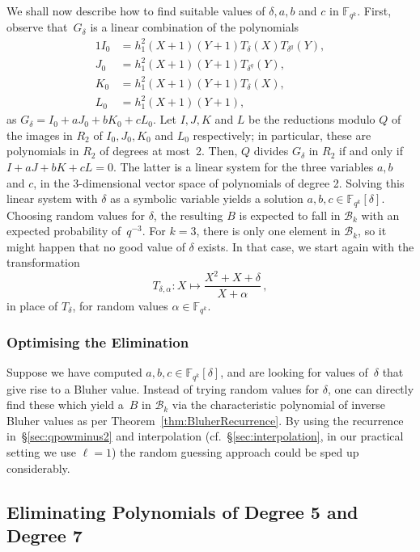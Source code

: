 \documentclass[11pt]{llncs}
\newcommand{\F}{\mathbb F}
\begin{document}
We shall now describe how to find suitable values of $\delta, a, b$ and $c$ in $\F_{q^k}$. First, observe that~$G_\delta$ is a linear combination of the polynomials
\begin{alignat*}{1}
I_0 &= h_1^2(X+1)(Y+1) T_\delta(X) T_{\delta^q}(Y),\\
J_0 &= h_1^2(X+1)(Y+1) T_{\delta^q}(Y),\\
K_0 &= h_1^2(X+1)(Y+1) T_\delta(X),\\
L_0 &= h_1^2(X+1)(Y+1),
\end{alignat*}
as $G_\delta = I_0 + aJ_0 + bK_0 + cL_0$. Let $I,J,K$ and $L$ be the reductions modulo $Q$ of the images in $R_2$ of $I_0, J_0, K_0$ and $L_0$ respectively; in particular, these are polynomials in $R_2$ of degrees at most~2. Then, $Q$ divides $G_\delta$ in $R_2$ if and only if $I + aJ + bK + cL = 0$. The latter is a linear system for the three variables $a,b$ and $c$, in the 3-dimensional vector space of polynomials of degree 2. Solving this linear system with $\delta$ as a symbolic variable yields a solution $a,b,c \in \F_{q^k}[\delta]$.
Choosing random values for $\delta$, the resulting $B$ is expected to fall in $\mathcal{B}_k$ with an expected probability of~$q^{-3}$. For $k = 3$, there is only one element in $\mathcal{B}_k$, so it might happen that no good value of $\delta$ exists. In that case, we start again with the transformation
\[ T_{\delta, \alpha} \colon X \longmapsto \frac {X^2 + X + \delta} {X + \alpha} \,, \]
in place of $T_{\delta}$, for random values $\alpha \in \F_{q^k}$.

\subsubsection{Optimising the Elimination}

Suppose we have computed $a, b, c \in \F_{q^k}[\delta]$, and are looking for values of~$\delta$ that give rise to a Bluher value.
Instead of trying random values for $\delta$, one can directly find these which yield a~$B$ in $\mathcal B_k$ via the characteristic polynomial of inverse Bluher values as per Theorem~\ref{thm:BluherRecurrence}.
By using the recurrence in~\S\ref{sec:qpowminus2} and interpolation (cf.~\S\ref{sec:interpolation}, in our practical setting we use $\ell = 1$) the random guessing approach could be sped up considerably.

\subsection{Eliminating Polynomials of Degree 5 and Degree 7}
\end{document}
